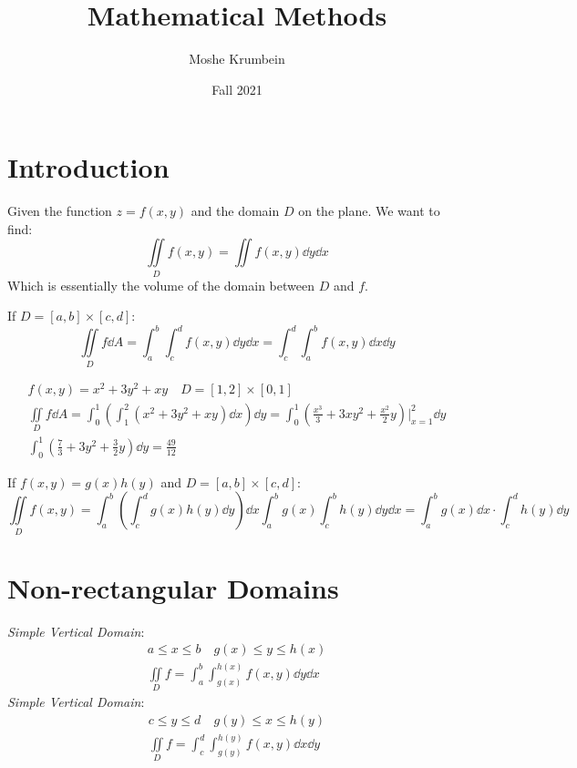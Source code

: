 


\title{Mathematical Methods}
\author{Moshe Krumbein}
\date{Fall 2021}



\section{Introduction}
Given the function $z=f(x,y)$ and the domain $D$ on the plane. We want to find:
$$\iint\limits_Df(x,y)=\iint f(x,y)\dd{y}\dd{x}$$
Which is essentially the volume of the domain between $D$ and $f$.
\begin{definition}
    If $D=[a,b]\times[c,d]$:
    $$\iint\limits_D f \dd{A}= \int_{a}^{b}\int_{c}^{d}
    f(x,y)\dd{y}\dd{x}=\int_{c}^{d}\int_{a}^{b} f(x,y)\dd{x}\dd{y}$$
\end{definition}
\begin{example}
    \begin{gather*}
        f(x,y)=x^2+3y^2+xy \quad D=[1,2]\times[0,1] \\
        \iint\limits_D f\dd{A} =
        \int_{0}^{1}\left(\int_{1}^{2}(x^2+3y^2+xy)\dd{x}\right)\dd{y} =
        \int_{0}^{1}\left(\frac{x^3}{3}+3xy^2+\frac{x^2}{2}y\right)\Biggr|_{x=1}^2\dd{y}
        \\
        \int_{0}^{1}\left(\frac{7}{3}+3y^2+\frac{3}{2}y\right)\dd{y}
        =\frac{49}{12}
    \end{gather*}
\end{example}
\begin{note}
    If $f(x,y)=g(x)h(y)$ and $D=[a,b]\times[c,d]$:
    $$\iint\limits_Df(x,y)=\int_{a}^{b}\left(\int_{c}^{d}g(x)h(y)\dd{y}\right)\dd{x}
    \int_{a}^{b}g(x)\int_{c}^{b}h(y)\dd{y}\dd{x} =
    \int_{a}^{b}g(x)\dd{x}\cdot\int_{c}^{d}h(y)\dd{y}
    $$
\end{note}
\section{Non-rectangular Domains}
\emph{Simple Vertical Domain}:
\begin{gather*}
    a \leq x \leq b \quad g(x) \leq y \leq h(x) \\
    \iint\limits_D f= \int_{a}^{b}\int_{g(x)}^{h(x)}f(x,y)\dd{y}\dd{x}
\end{gather*}
\emph{Simple Vertical Domain}:
\begin{gather*}
    c \leq y \leq d \quad g(y) \leq x \leq h(y) \\
    \iint\limits_D f= \int_{c}^{d}\int_{g(y)}^{h(y)}f(x,y)\dd{x}\dd{y}
\end{gather*}

